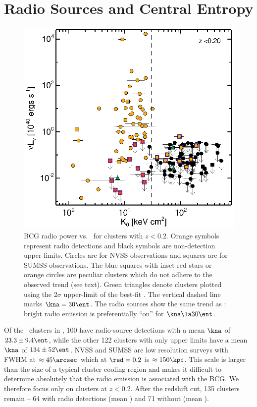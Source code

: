 \documentclass{emulateapj}
\begin{document}
\section{Radio Sources and Central Entropy}
\label{sec:agn}

\begin{figure}
  \begin{center}
    \includegraphics*[width=\columnwidth, trim=28mm 7mm 40mm 17mm, clip]{radio_zcut}
    \caption{BCG radio power vs. \kna\ for clusters with $z <
      0.2$. Orange symbols represent radio detections and black
      symbols are non-detection upper-limits. Circles are for NVSS
      observations and squares are for SUMSS observations. The blue
      squares with inset red stars or orange circles are peculiar
      clusters which do not adhere to the observed trend (see text).
      Green triangles denote clusters plotted using the 2$\sigma$
      upper-limit of the best-fit \kna. The vertical dashed line marks
      $\kna = 30 \ent$. The radio sources show the same trend as
      \halpha: bright radio emission is preferentially ``on'' for
      $\kna \la 30 \ent$.}
    \label{fig:radzcut}
  \end{center}
\end{figure}

Of the \clnum\ clusters in \accept, 100 have radio-source detections
with a mean $\kna$ of $23.3 \pm 9.4 \ent$, while the other 122
clusters with only upper limits have a mean $\kna$ of $134 \pm 52
\ent$. NVSS and SUMSS are low resolution surveys with FWHM at $\approx
45\arcsec$ which at $\red = 0.2$ is $\approx 150\kpc$. This scale is
larger than the size of a typical cluster cooling region and makes it
difficult to determine absolutely that the radio emission is
associated with the BCG. We therefore focus only on clusters at $z <
0.2$. After the redshift cut, 135 clusters remain -- 64 with radio
detections (mean \frad) and 71 without (mean \nfrad).
\end{document}
